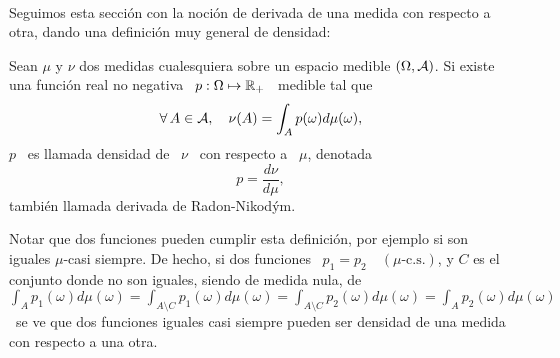 \

Seguimos esta secci\'on con la noci\'on de derivada de una medida con respecto a
otra, dando una definici\'on muy general de densidad:
%
\begin{definicion}
\label{Def:MP:DensidadMedida}
%
  Sean  $\mu$  y  $\nu$  dos  medidas  cualesquiera  sobre  un  espacio  medible
  $(\Omega,\mathcal{A})$.  Si existe una funci\'on  real no negativa \ $p: \Omega \mapsto
  \mathbb{R}_+$ \ medible tal que
  \[
  \forall \, A \in \mathcal{A}, \quad \nu(A) = \int_A p(\omega) d\mu(\omega),
  \]
  $p$ \ es llamada densidad de \ $\nu$ \ con respecto a \ $\mu$, denotada
  \[
  p = \frac{d\nu}{d\mu},
  \]
  tambi\'en llamada derivada de Radon-Nikod\'ym.
\end{definicion}

Notar   que dos funciones pueden  cumplir esta definici\'on,  por ejemplo si
son  iguales $\mu$-casi siempre.
%
De hecho, si  dos funciones \ $p_1  = p_2 \quad (\mu\mbox{-c.s.})$, y  $C$ es el
conjunto donde no son iguales, siendo de medida nula, 
de \ $\displaystyle  \int_A p_1(\omega)
d\mu(\omega) =  \int_{A\setminus C} p_1(\omega)  d\mu(\omega) = \int_{A\setminus
  C} p_2(\omega) d\mu(\omega) = \int_A p_2(\omega) d\mu(\omega)$ \ se ve que dos
funciones iguales casi siempre pueden ser  densidad de una medida con respecto a
una otra.

